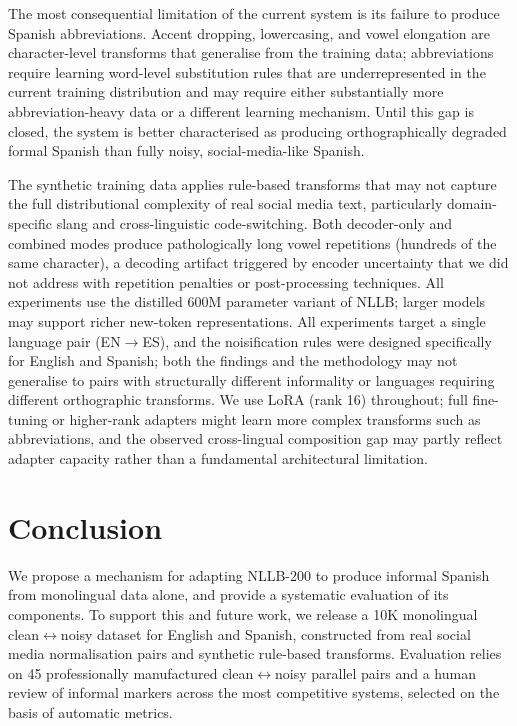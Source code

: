 \documentclass[11pt]{article}
\begin{document}
The most consequential limitation of the current system is its failure to
produce Spanish abbreviations. Accent dropping, lowercasing, and vowel
elongation are character-level transforms that generalise from the training data;
abbreviations require learning word-level substitution rules that are underrepresented in the current training distribution and may require either substantially more abbreviation-heavy data or a different learning mechanism. Until this gap is closed, the system is better characterised as producing orthographically degraded formal Spanish than fully noisy, social-media-like Spanish.

The synthetic training data applies rule-based transforms that may not capture
the full distributional complexity of real social media text, particularly
domain-specific slang and cross-linguistic code-switching. Both decoder-only and
combined modes produce pathologically long vowel repetitions
(hundreds of the same character), a decoding artifact triggered by encoder
uncertainty that we did not address with repetition penalties or
post-processing techniques. All experiments use the distilled 600M parameter variant of
NLLB; larger models may support richer new-token representations. All experiments target a single language pair
(EN$\rightarrow$ES), and the noisification rules were designed
specifically for English and Spanish; both the findings and the
methodology may not generalise to pairs with structurally
different informality or languages requiring different
orthographic transforms. We use LoRA (rank 16) throughout; full fine-tuning or higher-rank adapters might learn more complex transforms such as abbreviations, and the observed cross-lingual composition gap may partly reflect adapter
capacity rather than a fundamental architectural limitation.

\section*{Conclusion}

We propose a mechanism for adapting NLLB-200 to produce informal
Spanish from monolingual data alone, and provide a systematic
evaluation of its components. To support this and future work,
we release a 10K monolingual clean$\leftrightarrow$noisy dataset
for English and Spanish, constructed from real social media
normalisation pairs and synthetic rule-based transforms.
Evaluation relies on 45 professionally manufactured
clean$\leftrightarrow$noisy parallel pairs and a human review
of informal markers across the most competitive systems,
selected on the basis of automatic metrics.
\end{document}

